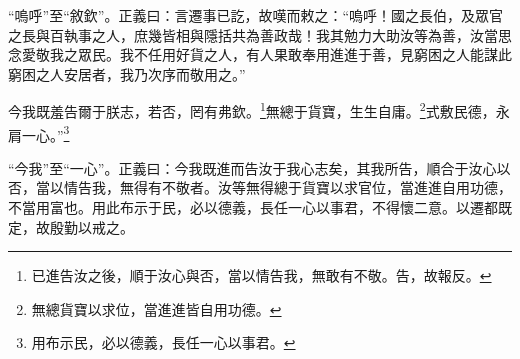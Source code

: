{\noindent\shu{}\fzkt “嗚呼”至“敘欽”。正義曰：言遷事已訖，故嘆而敕之：“嗚呼！國之長伯，及眾官之長與百執事之人，庶幾皆相與隱括共為善政哉！我其勉力大助汝等為善，汝當思念愛敬我之眾民。我不任用好貨之人，有人果敢奉用進進于善，見窮困之人能謀此窮困之人安居者，我乃次序而敬用之。” \par}

今我既羞告爾于朕志，若否，罔有弗欽。\footnote{已進告汝之後，順于汝心與否，當以情告我，無敢有不敬。告，故報反。}無總于貨寶，生生自庸。\footnote{無總貨寶以求位，當進進皆自用功德。}式敷民德，永肩一心。”\footnote{用布示民，必以德義，長任一心以事君。}

{\noindent\shu{}\fzkt “今我”至“一心”。正義曰：今我既進而告汝于我心志矣，其我所告，順合于汝心以否，當以情告我，無得有不敬者。汝等無得總于貨寶以求官位，當進進自用功德，不當用富也。用此布示于民，必以德義，長任一心以事君，不得懷二意。以遷都既定，故殷勤以戒之。 \par}

